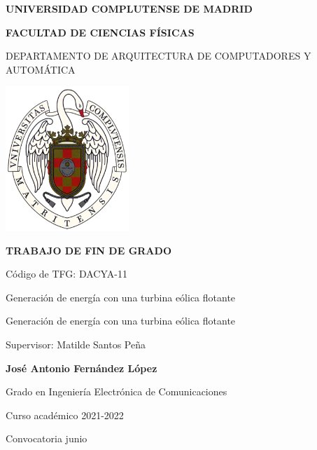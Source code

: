 
\begin{titlepage}
\centering
{ \bfseries \Large UNIVERSIDAD COMPLUTENSE DE MADRID}
\vspace{0.5cm}

{\bfseries  \Large FACULTAD DE CIENCIAS FÍSICAS} 
\vspace{1cm}

{\large DEPARTAMENTO DE ARQUITECTURA DE COMPUTADORES Y AUTOMÁTICA}
\vspace{0.8cm}

{\includegraphics[width=0.35\textwidth]{images/logo_UCM}} %
\vspace{0.8cm}

{\bfseries \Large TRABAJO DE FIN DE GRADO}
\vspace{2cm}

{\Large Código de TFG:  DACYA-11 } \vspace{5mm}

{\Large Generación de energía con una turbina eólica flotante}\vspace{5mm}

{\Large Generación de energía con una turbina eólica flotante}\vspace{5mm}

{\Large Supervisor: Matilde Santos Peña}\vspace{20mm} 

{\bfseries \LARGE José Antonio Fernández López}\vspace{5mm} 

{\large Grado en Ingeniería Electrónica de Comunicaciones}\vspace{5mm} 

{\large Curso académico 2021-2022}\vspace{5mm} 

{\large Convocatoria junio}\vspace{5mm} 

\end{titlepage}

